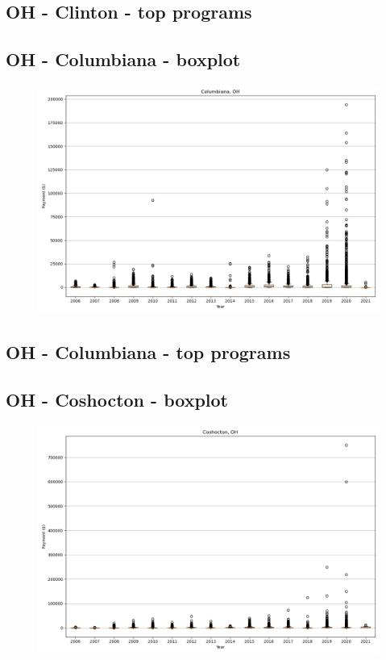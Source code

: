 \subsection*{OH - Clinton - top programs}

\newpage
\subsection*{OH - Columbiana - boxplot}
\begin{figure}[h]
\centering
\includegraphics[width=7in]{../output/boxplots/counties/Columbiana-OH_boxplot.png}
\end{figure}


\subsection*{OH - Columbiana - top programs}

\newpage
\subsection*{OH - Coshocton - boxplot}
\begin{figure}[h]
\centering
\includegraphics[width=7in]{../output/boxplots/counties/Coshocton-OH_boxplot.png}
\end{figure}


